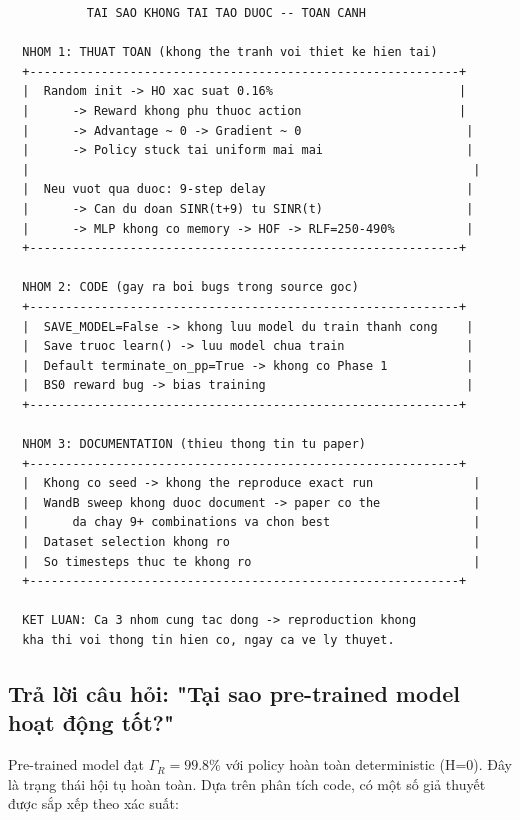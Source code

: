 \documentclass[11pt]{article}
\begin{document}
\begin{lstlisting}
           TAI SAO KHONG TAI TAO DUOC -- TOAN CANH

  NHOM 1: THUAT TOAN (khong the tranh voi thiet ke hien tai)
  +------------------------------------------------------------+
  |  Random init -> HO xac suat 0.16%                          |
  |      -> Reward khong phu thuoc action                      |
  |      -> Advantage ~ 0 -> Gradient ~ 0                       |
  |      -> Policy stuck tai uniform mai mai                    |
  |                                                              |
  |  Neu vuot qua duoc: 9-step delay                            |
  |      -> Can du doan SINR(t+9) tu SINR(t)                    |
  |      -> MLP khong co memory -> HOF -> RLF=250-490%          |
  +------------------------------------------------------------+

  NHOM 2: CODE (gay ra boi bugs trong source goc)
  +------------------------------------------------------------+
  |  SAVE_MODEL=False -> khong luu model du train thanh cong    |
  |  Save truoc learn() -> luu model chua train                 |
  |  Default terminate_on_pp=True -> khong co Phase 1           |
  |  BS0 reward bug -> bias training                            |
  +------------------------------------------------------------+

  NHOM 3: DOCUMENTATION (thieu thong tin tu paper)
  +------------------------------------------------------------+
  |  Khong co seed -> khong the reproduce exact run              |
  |  WandB sweep khong duoc document -> paper co the             |
  |      da chay 9+ combinations va chon best                    |
  |  Dataset selection khong ro                                  |
  |  So timesteps thuc te khong ro                               |
  +------------------------------------------------------------+

  KET LUAN: Ca 3 nhom cung tac dong -> reproduction khong
  kha thi voi thong tin hien co, ngay ca ve ly thuyet.
\end{lstlisting}

\subsection{Trả lời câu hỏi: "Tại sao pre-trained model hoạt động tốt?"}

Pre-trained model đạt $\Gamma_R = 99.8\%$ với policy hoàn toàn deterministic (H=0). Đây là trạng thái hội tụ hoàn toàn. Dựa trên phân tích code, có một số giả thuyết được sắp xếp theo xác suất:
\end{document}
